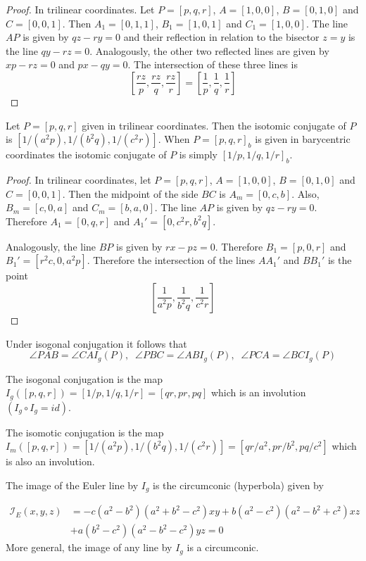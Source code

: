 	\begin{proof} In trilinear coordinates. Let $P=[p,q,r]$, $A=[1,0,0]$, $B=[0,1,0] $ and $C=[0,0,1]$.
	Then $A_1=[0,1,1]$, $B_1=[1,0,1]$ and $C_1=[1,0,0]$. The line $AP$ is given by
	$q z - r y=0$ and their reflection in relation to the bisector $z=y$ is the line $  q y-r z=0$. Analogously, the other two reflected lines are given by $ x p-r z=0$ and $p x-q y=0$. The intersection of these three lines is 
	\[ [\frac{r z}{p},\frac{r z}{q},\frac{r z}{r}]= [\frac{1}{p},\frac{1}{q},\frac{1}{r}]\]
	\end{proof}

	 
	
		\begin{proposition}
	Let $P=[p,q,r]$ given in trilinear coordinates. Then the isotomic  conjugate of $P$ is $[1/(a^2 p),1/(b^2 q),1/(c^2 r)]$.
	When $P=[p,q,r]_b$ is given in barycentric coordinates   the isotomic conjugate of $P$ is simply $[1/p, 1/q, 1/r]_b$.
	\end{proposition}
 \begin{proof}
 In trilinear coordinates,  let $P=[p,q,r]$, $A=[1,0,0]$, $B=[0,1,0] $ and $C=[0,0,1]$.
	Then the midpoint of the side $BC$ is $A_m=[0,c,b]$. Also, $B_m=[c,0,a]$ and $C_m=[b,a,0]$. The line $AP$ is given by
	$q z - r y=0$. Therefore $A_1=[0,q,r]$ and $A_1'=[0,c^2r,b^2q]$. 
 
	Analogously, the   line $BP$ is given by $   r x-p z=0  $. Therefore $B_1=[ p,0,r]$ and
	$B_1'=[r^ 2c,0,a^2p]$.  
	Therefore the intersection of the   lines $AA_1'$ and $BB_1'$ is the point
	\[[\frac{1}{  a^2 p},\frac{1}{b^2 q},\frac{1}{c^2 r} ] \]
 \end{proof}
 
	\begin{remark}
	Under isogonal conjugation it follows that
	\[\angle P A B = \angle C A I_g(P),\;\; \angle P B C = \angle A B I_g(P),\;\; \angle P C A = \angle B  C I_g(P)\]
	\end{remark}
	The isogonal conjugation is the map $I_g([p,q,r])=[1/p,1/q,1/r]=[q r,p r,p q]$ which is an involution $(I_g\circ I_g=id)$.
	
	The isomotic conjugation is the map $I_m([p,q,r])=[1/(a^2p),1/(b^2 q),1/(c^2r)]=[  q r/a^2, p r/b^2, p q/c^2]$ which is also an involution.

	\begin{proposition} The image of the Euler line by $I_g$ is the circumconic (hyperbola) given by
	
	\begin{align*}
\mathcal{I}_E(x,y,z)&=-c \left( a^2-b^2 \right)   \left( {a}^{2}+{b}^{2}-{c}^
{2} \right) x y+b \left( a^2-c^2 \right)    \left( {a}^{2
}-{b}^{2}+{c}^{2} \right) x z\\
&+a \left( b^2-c^2 \right)  
 \left( {a}^{2}-{b}^{2}-{c}^{2} \right) y z  =0
	\end{align*}
	More general, the image of any line by $I_g$ is a  circumconic.
	\end{proposition}
	
